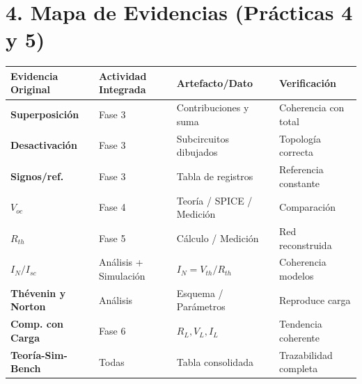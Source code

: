 \documentclass[11pt, a4paper]{article}
\begin{document}
\section*{4. Mapa de Evidencias (Prácticas 4 y 5)}
\noindent 
\begin{tabularx}{\textwidth}{|>{\RaggedRight\bfseries}p{2.2cm}|>{\RaggedRight}X|>{\RaggedRight}X|>{\RaggedRight}X|}
\hline
\rowcolor{ucbblue!10}
\textbf{Evidencia Original} & \textbf{Actividad Integrada} & \textbf{Artefacto/Dato} & \textbf{Verificación} \\ \hline
Superposición & Fase 3 & Contribuciones y suma & Coherencia con total \\ \hline
Desactivación & Fase 3 & Subcircuitos dibujados & Topología correcta \\ \hline
Signos/ref. & Fase 3 & Tabla de registros & Referencia constante \\ \hline
$V_{oc}$ & Fase 4 & Teoría / SPICE / Medición & Comparación \\ \hline
$R_{th}$ & Fase 5 & Cálculo / Medición & Red reconstruida \\ \hline
$I_N / I_{sc}$ & Análisis + Simulación & $I_N = V_{th}/R_{th}$ & Coherencia modelos \\ \hline
Thévenin y Norton & Análisis & Esquema / Parámetros & Reproduce carga \\ \hline
Comp. con Carga & Fase 6 & $R_L, V_L, I_L$ & Tendencia coherente \\ \hline
Teoría-Sim-Bench & Todas & Tabla consolidada & Trazabilidad completa \\ \hline
\end{tabularx}
\end{document}
